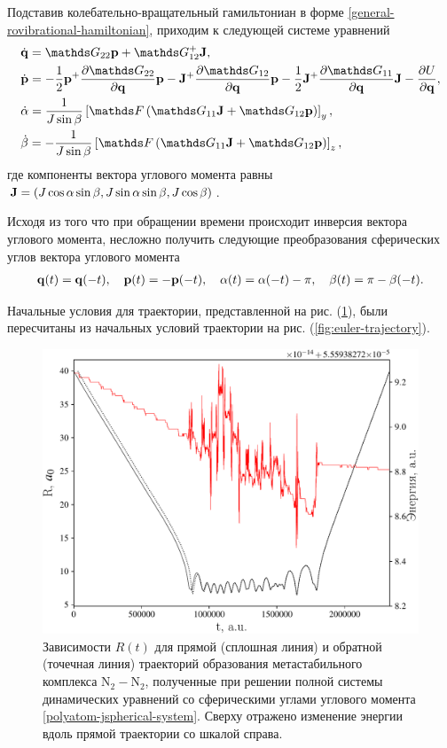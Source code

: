 Подставив колебательно-вращательный гамильтониан в форме \eqref{general-rovibrational-hamiltonian}, приходим к следующей системе уравнений
\begin{gather}
    \begin{aligned}
        &\dot{\mf{q}} = \bbG_{22} \mf{p} + \bbG_{12}^+ \mf{J}, \\
        &\dot{\mf{p}} = -\frac{1}{2} \mf{p}^+ \frac{\partial \bbG_{22}}{\partial \mf{q}} \mf{p} - \mf{J}^+ \frac{\partial \bbG_{12}}{\partial \mf{q}} \mf{p} - \frac{1}{2} \mf{J}^+ \frac{\partial \bbG_{11}}{\partial \mf{q}} \mf{J} - \frac{\partial U}{\partial \mf{q}}, \\
        &\dot{\alpha} = \frac{1}{J \sin \beta} \lsq \bbF \lb \bbG_{11} \mf{J} + \bbG_{12} \mf{p} \rb \rsq_y, \\
        &\dot{\beta} = -\frac{1}{J \sin \beta} \lsq \bbF \lb \bbG_{11} \mf{J} + \bbG_{12} \mf{p} \rb \rsq_z, 
    \end{aligned} \label{polyatom-jspherical-system}
\end{gather}
%
где компоненты вектора углового момента равны $\mathbf{J} = \left( J \cos \alpha \sin \beta, J \sin \alpha \sin \beta, J \cos \beta \right)$. \par
Исходя из того что при обращении времени происходит инверсия вектора углового момента, несложно получить следующие преобразования сферических углов вектора углового момента
\begin{gather}
    \mathbf{q}(t) = \mathbf{q}(-t), \quad \mathbf{p}(t) = -\mathbf{p}(-t), \quad \alpha(t) = \alpha(-t) - \pi, \quad \beta(t) = \pi - \beta(-t).
\end{gather}

Начальные условия для траектории, представленной на рис. (\ref{fig:jspherical-trajectory}), были пересчитаны из начальных условий траектории на рис. (\ref{fig:euler-trajectory}). 

\begin{figure}[H]
    \centering
    \includegraphics[width=0.75\linewidth]{./pictures/trajectories/spherical_trajectory-crop.pdf}
    \caption{Зависимости $R(t)$ для прямой (сплошная линия) и обратной (точечная линия) траекторий образования метастабильного комплекса N$_2-$N$_2$, полученные при решении полной системы динамических уравнений со сферическими углами углового момента \eqref{polyatom-jspherical-system}. Сверху отражено изменение энергии вдоль прямой траектории со шкалой справа.}
    \label{fig:jspherical-trajectory}
\end{figure}

